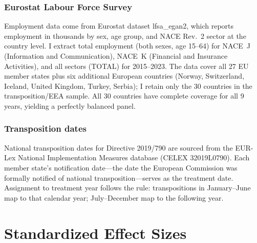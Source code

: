 \documentclass[12pt]{article}
\begin{document}
\subsubsection*{Eurostat Labour Force Survey}  Employment data come from Eurostat dataset lfsa\_egan2, which reports employment in thousands by sex, age group, and NACE Rev.~2 sector at the country level. I extract total employment (both sexes, age 15--64) for NACE~J (Information and Communication), NACE~K (Financial and Insurance Activities), and all sectors (TOTAL) for 2015--2023. The data cover all 27 EU member states plus six additional European countries (Norway, Switzerland, Iceland, United Kingdom, Turkey, Serbia); I retain only the 30 countries in the transposition/EEA sample. All 30 countries have complete coverage for all 9 years, yielding a perfectly balanced panel.

\subsubsection*{Transposition dates}  National transposition dates for Directive 2019/790 are sourced from the EUR-Lex National Implementation Measures database (CELEX 32019L0790). Each member state's notification date---the date the European Commission was formally notified of national transposition---serves as the treatment date. Assignment to treatment year follows the rule: transpositions in January--June map to that calendar year; July--December map to the following year.



\section{Standardized Effect Sizes}
\label{sec:sde}


\end{document}
